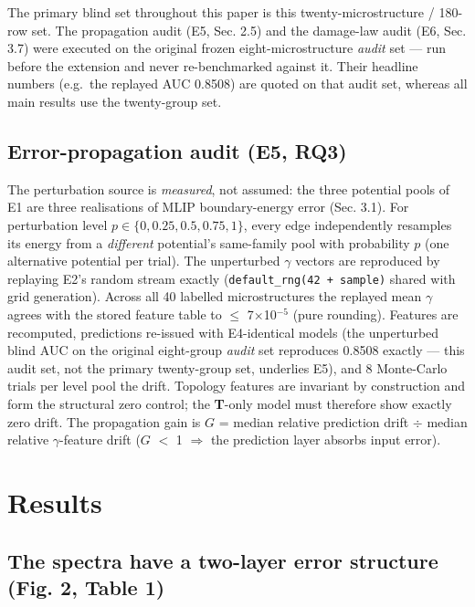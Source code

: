 \documentclass[11pt]{article}
\begin{document}
The primary blind set throughout this paper is this twenty-microstructure / 180-row set. The propagation audit (E5, Sec. 2.5) and the damage-law audit (E6, Sec. 3.7) were executed on the original frozen eight-microstructure \textit{audit} set --- run before the extension and never re-benchmarked against it. Their headline numbers (e.g.\ the replayed AUC 0.8508) are quoted on that audit set, whereas all main results use the twenty-group set.

\subsection{Error-propagation audit (E5, RQ3)}

The perturbation source is \textit{measured}, not assumed: the three potential pools of E1 are three realisations of MLIP boundary-energy error (Sec. 3.1). For perturbation level $p \in \{0, 0.25, 0.5, 0.75, 1\}$, every edge independently resamples its energy from a \textit{different} potential's same-family pool with probability $p$ (one alternative potential per trial). The unperturbed $\gamma$ vectors are reproduced by replaying E2's random stream exactly (\texttt{default\_rng(42 + sample)} shared with grid generation). Across all 40 labelled microstructures the replayed mean $\gamma$ agrees with the stored feature table to $\le$ 7$\times$10$^{-5}$ (pure rounding). Features are recomputed, predictions re-issued with E4-identical models (the unperturbed blind AUC on the original eight-group \textit{audit} set reproduces 0.8508 exactly --- this audit set, not the primary twenty-group set, underlies E5), and 8 Monte-Carlo trials per level pool the drift. Topology features are invariant by construction and form the structural zero control; the \textbf{T}-only model must therefore show exactly zero drift. The propagation gain is $G$ = median relative prediction drift $\div$ median relative $\gamma$-feature drift ($G$ $<$ 1 $\Rightarrow$ the prediction layer absorbs input error).

\section{Results}

\subsection{The spectra have a two-layer error structure (Fig. 2, Table 1)}
\end{document}
